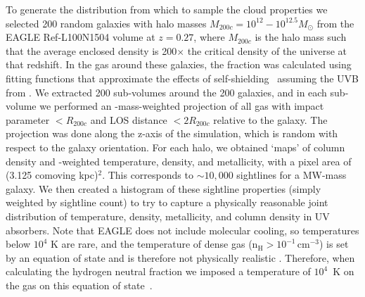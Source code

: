 \documentclass[fleqn,usenatbib]{mnras}
\begin{document}
To generate the distribution from which to sample the cloud properties we selected 200 random galaxies with halo masses $M_{200c} = 10^{12} - 10^{12.5} M_\odot$ from the EAGLE Ref-L100N1504 volume at $z=0.27$, where $M_{200c}$ is the halo mass such that the average enclosed density is 200$\times$ the critical density of the universe at that redshift.
In the gas around these galaxies, the  fraction was calculated using fitting functions that approximate the effects of self-shielding~\citep{rahmati2013Impact} assuming the UVB from \citet{haardt2001Modelling}.
We extracted 200 sub-volumes around the 200 galaxies, and in each sub-volume we performed an -mass-weighted projection of all gas with impact parameter $< R_{200c}$ and LOS distance $< 2 R_{200c}$ relative to the galaxy. The projection was done along the z-axis of the simulation, which is random with respect to the galaxy orientation.
For each halo, we obtained  `maps' of  column density and -weighted temperature, density, and metallicity, with a pixel area of (3.125 comoving kpc)$^2$.
This corresponds to $\sim 10,000$ sightlines for a MW-mass galaxy.
We then created a histogram of these sightline properties (simply weighted by sightline count) to try to capture a physically reasonable joint distribution of temperature, density, metallicity, and  column density in UV absorbers.
Note that EAGLE does not include molecular cooling, so temperatures below $10^4$ K are rare, and the temperature of dense gas ($\mathrm{n}_{\mathrm{H}} > 10^{-1} \, \mathrm{cm}^{-3}$) is set by an equation of state and is therefore not physically realistic \citep{schaye2015EAGLE}.
Therefore, when calculating the hydrogen neutral fraction we imposed a temperature of $10^4$~K on the gas on this equation of state~\citep[following e.g.,][]{Rahmati2016}.
\end{document}
